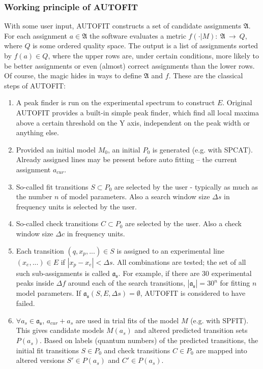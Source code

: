 \documentclass[11pt]{article}
\begin{document}
\subsubsection{Working principle of AUTOFIT}

With some user input, AUTOFIT constructs a set of candidate assignments $\mathfrak{A}$. For each assignment $a \in \mathfrak{A}$ the software evaluates a metric $f(\cdot | M):~\mathfrak{A}~\rightarrow~Q$, where $Q$ is some ordered quality space. The output is a list of assignments sorted by $f(a) \in Q$, where the upper rows are, under certain conditions, more likely to be better assignments or even (almost) correct assignments than the lower rows. Of course, the magic hides in ways to define $\mathfrak{A}$ and $f$. These are the classical steps of AUTOFIT:

\begin{enumerate}
	\item A peak finder is run on the experimental spectrum to construct $E$. Original AUTOFIT provides a built-in simple peak finder, which find all local maxima above a certain threshold on the Y axis, independent on the peak width or anything else. 
	\item Provided an initial model $M_0$, an initial $P_0$ is generated (e.g. with SPCAT). Already assigned lines may be present before auto fitting -- the current assignment $a_{cur}$.
	\item So-called fit transitions $S \subset P_0$ are selected by the user - typically as much as the number $n$ of model parameters. Also a search window size $\Delta s$ in frequency units is selected by the user.
	\item So-called check transitions $C \subset P_0$ are selected by the user. Also a check window size $\Delta c$ in frequency units. 
		\item Each transition $(q, x_p, ...) \in S$ is assigned to an experimental line $(x_e, ...) \in E$ if $|x_p - x_e| < \Delta s$. All combinations are tested; the set of all such sub-assignments is called $\mathfrak{a_s}$. For example, if there are 30 experimental peaks inside $\Delta f$ around each of the search transitions, $|\mathfrak{a_s}| = 30^{n}$ for fitting $n$ model parameters. If $\mathfrak{a_s}(S, E, \Delta s) = \emptyset$, AUTOFIT is considered to have failed. 
		\item $\forall a_s \in \mathfrak{a_s}$, $a_{cur} + a_s$ are used in trial fits of the model $M$ (e.g. with SPFIT). This gives candidate models $M(a_s)$ and altered predicted transition sets $P(a_s)$. Based on labels (quantum numbers) of the predicted transitions, the initial fit transitions $S \in P_0$ and check transitions $C \in P_0$ are mapped into altered versions $S' \in P(a_s)$ and $C' \in P(a_s)$. 


\end{enumerate}
\end{document}
